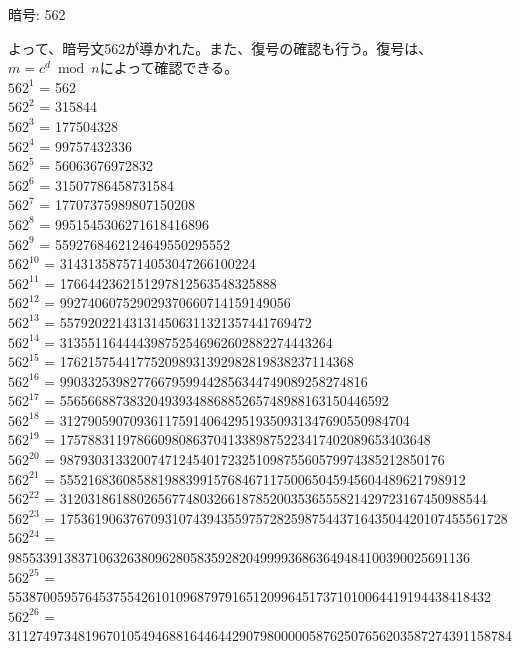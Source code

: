 \documentclass[uplatex]{jsarticle}
\begin{document}
暗号: 562

よって、暗号文562が導かれた。また、復号の確認も行う。復号は、$m = c^d \bmod n$によって確認できる。\\
$562^{1}$ = 562\\
$562^{2}$ = 315844\\
$562^{3}$ = 177504328\\
$562^{4}$ = 99757432336\\
$562^{5}$ = 56063676972832\\
$562^{6}$ = 31507786458731584\\
$562^{7}$ = 17707375989807150208\\
$562^{8}$ = 9951545306271618416896\\
$562^{9}$ = 5592768462124649550295552\\
$562^{10}$ = 3143135875714053047266100224\\
$562^{11}$ = 1766442362151297812563548325888\\
$562^{12}$ = 992740607529029370660714159149056\\
$562^{13}$ = 557920221431314506311321357441769472\\
$562^{14}$ = 313551164444398752546962602882274443264\\
$562^{15}$ = 176215754417752098931392982819838237114368\\
$562^{16}$ = 99033253982776679599442856344749089258274816\\
$562^{17}$ = 55656688738320493934886885265748988163150446592\\
$562^{18}$ = 31279059070936117591406429519350931347690550984704\\
$562^{19}$ = 17578831197866098086370413389875223417402089653403648\\
$562^{20}$ = 9879303133200747124540172325109875560579974385212850176\\
$562^{21}$ = 5552168360858819883991576846711750065045945604489621798912\\
$562^{22}$ = 3120318618802656774803266187852003536555821429723167450988544\\
$562^{23}$ = 1753619063767093107439435597572825987544371643504420107455561728\\
$562^{24}$ = 985533913837106326380962805835928204999936863649484100390025691136\\
$562^{25}$ = 553870059576453755426101096879791651209964517371010064419194438418432\\
$562^{26}$ = 311274973481967010549468816446442907980000058762507656203587274391158784\\
\end{document}

